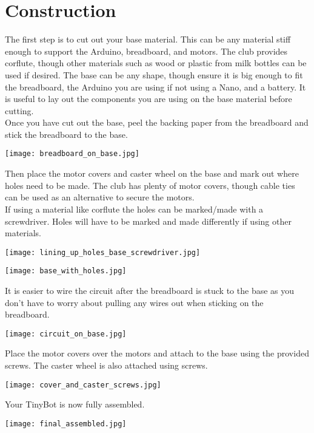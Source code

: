 \documentclass[../TinyBot.tex]{subfiles}
\begin{document}
\section{Construction} \label{sec:construction}

The first step is to cut out your base material. This can be any material stiff enough to support the Arduino, breadboard, and motors. The club provides corflute, though other materials such as wood or plastic from milk bottles can be used if desired. The base can be any shape, though ensure it is big enough to fit the breadboard, the Arduino you are using if not using a Nano, and a battery.
It is useful to lay out the components you are using on the base material before cutting. \\

Once you have cut out the base, peel the backing paper from the breadboard and stick the breadboard to the base.
\begin{center}
    \texttt{[image: breadboard\_on\_base.jpg]}
\end{center}

Then place the motor covers and caster wheel on the base and mark out where holes need to be made. The club has plenty of motor covers, though cable ties can be used as an alternative to secure the motors. \\
If using a material like corflute the holes can be marked/made with a screwdriver. Holes will have to be marked and made differently if using other materials. 
\begin{center}
    \texttt{[image: lining\_up\_holes\_base\_screwdriver.jpg]}
\end{center}

\begin{center}
    \texttt{[image: base\_with\_holes.jpg]}
\end{center}

It is easier to wire the circuit after the breadboard is stuck to the base as you don't have to worry about pulling any wires out when sticking on the breadboard. 

\begin{center}
    \texttt{[image: circuit\_on\_base.jpg]}
\end{center}


Place the motor covers over the motors and attach to the base using the provided screws. The caster wheel is also attached using screws. 

\begin{center}
    \texttt{[image: cover\_and\_caster\_screws.jpg]}
\end{center}

Your TinyBot is now fully assembled.
\begin{center}
    \texttt{[image: final\_assembled.jpg]}
\end{center}
\end{document}
